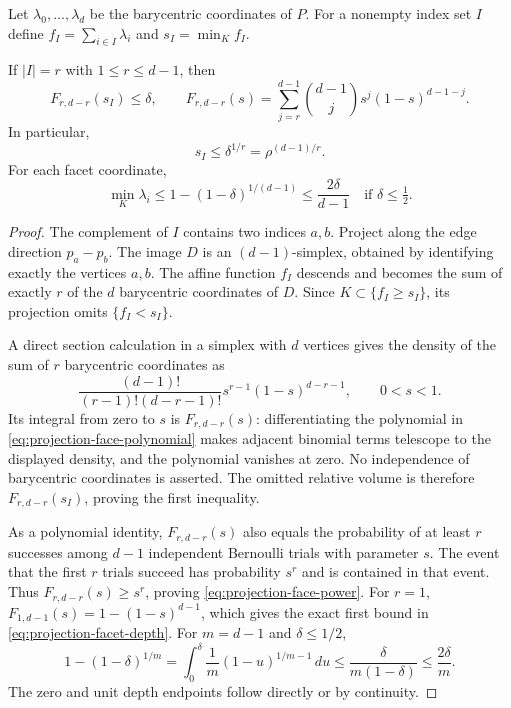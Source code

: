Let $\lambda_0,\ldots,\lambda_d$ be the barycentric coordinates of
$P$.  For a nonempty index set $I$ define
$f_I=\sum_{i\in I}\lambda_i$ and $s_I=\min_K f_I$.

\begin{theorem}
\label{thm:projection-face-depth}
If $|I|=r$ with $1\leq r\leq d-1$, then
\begin{equation}
 F_{r,d-r}(s_I)\leq\delta,\qquad
 F_{r,d-r}(s)=\sum_{j=r}^{d-1}
     \binom{d-1}{j}s^j(1-s)^{d-1-j}.
 \label{eq:projection-face-polynomial}
\end{equation}
In particular,
\begin{equation}
 s_I\leq\delta^{1/r}=\rho^{(d-1)/r}.
 \label{eq:projection-face-power}
\end{equation}
For each facet coordinate,
\begin{equation}
 \min_K\lambda_i\leq1-(1-\delta)^{1/(d-1)}
 \leq\frac{2\delta}{d-1}\quad\text{if }\delta\leq\tfrac12.
 \label{eq:projection-facet-depth}
\end{equation}
\end{theorem}

\begin{proof}
The complement of $I$ contains two indices $a,b$.  Project along
the edge direction $p_a-p_b$.  The image $D$ is an $(d-1)$-simplex,
obtained by identifying exactly the vertices $a,b$.  The affine
function $f_I$ descends and becomes the sum of exactly $r$ of the
$d$ barycentric coordinates of $D$.  Since $K\subset\{f_I\geq s_I\}$,
its projection omits $\{f_I<s_I\}$.

A direct section calculation in a simplex with $d$ vertices gives
the density of the sum of $r$ barycentric coordinates as
\[
 \frac{(d-1)!}{(r-1)!(d-r-1)!}
 s^{r-1}(1-s)^{d-r-1},\qquad 0<s<1.
\]
Its integral from zero to $s$ is $F_{r,d-r}(s)$: differentiating
the polynomial in \eqref{eq:projection-face-polynomial} makes
adjacent binomial terms telescope to the displayed density, and the
polynomial vanishes at zero.  No independence of barycentric
coordinates is asserted.  The omitted relative volume is therefore
$F_{r,d-r}(s_I)$, proving the first inequality.

As a polynomial identity, $F_{r,d-r}(s)$ also equals the probability
of at least $r$ successes among $d-1$ independent Bernoulli trials
with parameter $s$.  The event that the first $r$ trials succeed
has probability $s^r$ and is contained in that event.  Thus
$F_{r,d-r}(s)\geq s^r$, proving \eqref{eq:projection-face-power}.
For $r=1$, $F_{1,d-1}(s)=1-(1-s)^{d-1}$, which gives the exact
first bound in \eqref{eq:projection-facet-depth}.  For
$m=d-1$ and $\delta\leq1/2$,
\[
 1-(1-\delta)^{1/m}
 =\int_0^\delta\frac1m(1-u)^{1/m-1}\,du
 \leq\frac{\delta}{m(1-\delta)}\leq\frac{2\delta}{m}.
\]
The zero and unit depth endpoints follow directly or by continuity.
\end{proof}

